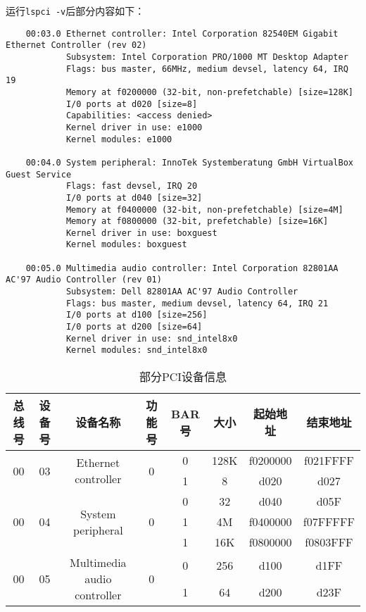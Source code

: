 \documentclass[UTF8]{report}
\begin{document}
运行\texttt{lspci -v}后部分内容如下：

\begin{lstlisting}
    00:03.0 Ethernet controller: Intel Corporation 82540EM Gigabit Ethernet Controller (rev 02)
            Subsystem: Intel Corporation PRO/1000 MT Desktop Adapter
            Flags: bus master, 66MHz, medium devsel, latency 64, IRQ 19
            Memory at f0200000 (32-bit, non-prefetchable) [size=128K]
            I/0 ports at d020 [size=8]
            Capabilities: <access denied>
            Kernel driver in use: e1000
            Kernel modules: e1000

    00:04.0 System peripheral: InnoTek Systemberatung GmbH VirtualBox Guest Service
            Flags: fast devsel, IRQ 20
            I/0 ports at d040 [size=32]
            Memory at f0400000 (32-bit, non-prefetchable) [size=4M]
            Memory at f0800000 (32-bit, prefetchable) [size=16K]
            Kernel driver in use: boxguest
            Kernel modules: boxguest

    00:05.0 Multimedia audio controller: Intel Corporation 82801AA AC'97 Audio Controller (rev 01)
            Subsystem: Dell 82801AA AC'97 Audio Controller
            Flags: bus master, medium devsel, latency 64, IRQ 21
            I/0 ports at d100 [size=256]
            I/0 ports at d200 [size=64]
            Kernel driver in use: snd_intel8x0
            Kernel modules: snd_intel8x0
\end{lstlisting}

\begin{table}[H]
    \centering
    \caption{部分PCI设备信息}
    \begin{tabular}{|c|c|c|c|c|c|c|c|}
        \hline
        总线号 & 设备号 & 设备名称 & 功能号 & BAR号 & 大小 & 起始地址 & 结束地址 \\
        \hline
        \multirow{2}{*}{00} & \multirow{2}{*}{03} & \multirow{2}{*}{Ethernet controller} & \multirow{2}{*}{0} & 0 & 128K & f0200000 & f021FFFF \\
        \cline{5-8}
        & & & & 1 & 8 & d020 & d027 \\
        \hline
        \multirow{3}{*}{00} & \multirow{3}{*}{04} & \multirow{3}{*}{System peripheral} & \multirow{3}{*}{0} & 0 & 32 & d040 & d05F \\
        \cline{5-8}
        & & & & 1 & 4M & f0400000 & f07FFFFF \\
        \cline{5-8}
        & & & & 1 & 16K & f0800000 & f0803FFF \\
        \hline
        \multirow{2}{*}{00} & \multirow{2}{*}{05} & \multirow{2}{*}{Multimedia audio controller} & \multirow{2}{*}{0} & 0 & 256 & d100 & d1FF \\
        \cline{5-8}
        & & & & 1 & 64 & d200 & d23F \\
        \hline
    \end{tabular}
\end{table}
\end{document}
